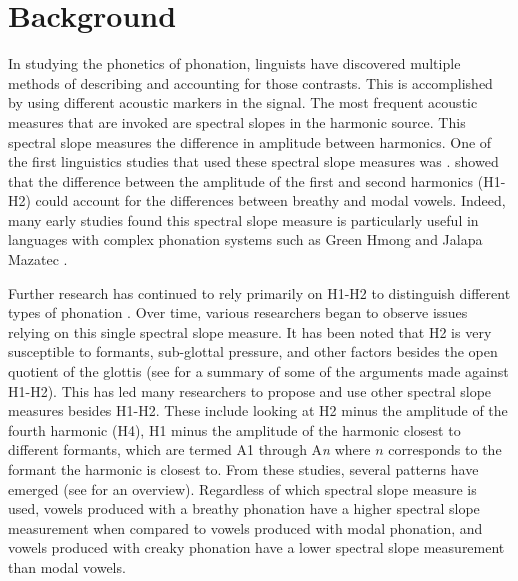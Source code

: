 \documentclass[12pt, letterpaper]{article}
\begin{document}
\section{Background} \label{sec:Background}

In studying the phonetics of phonation, linguists have discovered multiple methods of describing and accounting for those contrasts. This is accomplished by using different acoustic markers in the signal. The most frequent acoustic measures that are invoked are spectral slopes in the harmonic source. This spectral slope measures the difference in amplitude between harmonics. One of the first linguistics studies that used these spectral slope measures was \cite{fischer-jorgensenPhoneticAnalysisBreathy1968}. \citeauthor{fischer-jorgensenPhoneticAnalysisBreathy1968} showed that the difference between the amplitude of the first and second harmonics (H1-H2) could account for the differences between breathy and modal vowels. Indeed, many early studies found this spectral slope measure is particularly useful in languages with complex phonation systems such as Green Hmong \citep{huffmanMeasuresPhonationType1987,andruskiPhonationTypesProduction2000} and Jalapa Mazatec \citep{silvermanPhoneticStructuresJalapa1995,blankenshipTimeCourseBreathiness1997}.

Further research has continued to rely primarily on H1-H2 to distinguish different types of phonation \citep[e.g.,][]{huffmanMeasuresPhonationType1987,klattAnalysisSynthesisPerception1990}. Over time, various researchers began to observe issues relying on this single spectral slope measure. It has been noted that H2 is very susceptible to formants, sub-glottal pressure, and other factors besides the open quotient of the glottis (see \cite{simpsonFirstSecondHarmonics2012, zhangMechanicsHumanVoice2016,zhangCauseeffectRelationshipVocal2016,chaiH1H2Acoustic2022} for a summary of some of the arguments made against H1-H2). This has led many researchers to propose and use other spectral slope measures besides H1-H2. These include looking at H2 minus the amplitude of the fourth harmonic (H4), H1 minus the amplitude of the harmonic closest to different formants, which are termed A1 through A\textit{n} where $n$ corresponds to the formant the harmonic is closest to. From these studies, several patterns have emerged (see \cite{garellekPhoneticsVoice2019} for an overview). Regardless of which spectral slope measure is used, vowels produced with a breathy phonation have a higher spectral slope measurement when compared to vowels produced with modal phonation, and vowels produced with creaky phonation have a lower spectral slope measurement than modal vowels.  
\end{document}
